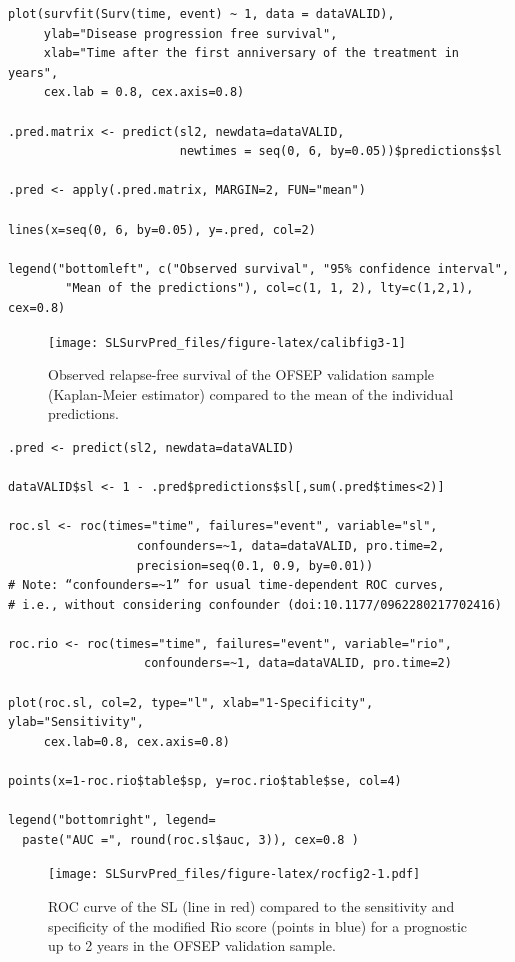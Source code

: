 \begin{verbatim}
plot(survfit(Surv(time, event) ~ 1, data = dataVALID), 
     ylab="Disease progression free survival",
     xlab="Time after the first anniversary of the treatment in years",
     cex.lab = 0.8, cex.axis=0.8)

.pred.matrix <- predict(sl2, newdata=dataVALID,
                        newtimes = seq(0, 6, by=0.05))$predictions$sl

.pred <- apply(.pred.matrix, MARGIN=2, FUN="mean")

lines(x=seq(0, 6, by=0.05), y=.pred, col=2)

legend("bottomleft", c("Observed survival", "95% confidence interval",
        "Mean of the predictions"), col=c(1, 1, 2), lty=c(1,2,1), cex=0.8)
\end{verbatim}

\begin{figure}
\texttt{[image: SLSurvPred\_files/figure-latex/calibfig3-1]} \caption{Observed relapse-free survival of the OFSEP validation sample (Kaplan-Meier estimator) compared to the mean of the individual predictions.}\label{fig:calibfig3}
\end{figure}

\clearpage

\begin{verbatim}
.pred <- predict(sl2, newdata=dataVALID)

dataVALID$sl <- 1 - .pred$predictions$sl[,sum(.pred$times<2)]

roc.sl <- roc(times="time", failures="event", variable="sl",
                  confounders=~1, data=dataVALID, pro.time=2,
                  precision=seq(0.1, 0.9, by=0.01)) 
# Note: “confounders=~1” for usual time-dependent ROC curves,
# i.e., without considering confounder (doi:10.1177/0962280217702416)

roc.rio <- roc(times="time", failures="event", variable="rio",
                   confounders=~1, data=dataVALID, pro.time=2)

plot(roc.sl, col=2, type="l", xlab="1-Specificity", ylab="Sensitivity",
     cex.lab=0.8, cex.axis=0.8)

points(x=1-roc.rio$table$sp, y=roc.rio$table$se, col=4)

legend("bottomright", legend=
  paste("AUC =", round(roc.sl$auc, 3)), cex=0.8 )
\end{verbatim}

\begin{figure}
\centering
\texttt{[image: SLSurvPred\_files/figure-latex/rocfig2-1.pdf]}
\caption{\label{fig:rocfig2}ROC curve of the SL (line in red) compared to the sensitivity and specificity of the modified Rio score (points in blue) for a prognostic up to 2 years in the OFSEP validation sample.}
\end{figure}

